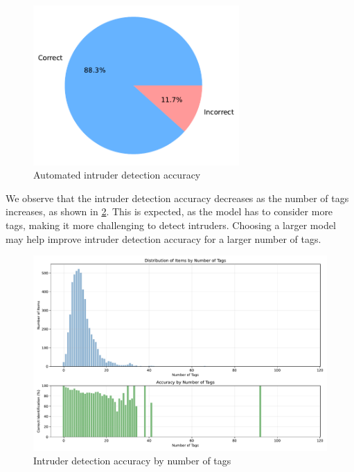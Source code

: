 \begin{figure}[h]
    \centering
    \includegraphics[width=0.7\textwidth]{figures/gpt_intruder_detection_accuracy.pdf}
    \caption{Automated intruder detection accuracy}
    \label{fig:gpt_intruder_detection_accuracy}
\end{figure}

We observe that the intruder detection accuracy decreases as the number of tags increases, as shown in \cref{fig:gpt_accuracy_by_num_tags}. This is expected, as the model has to consider more tags, making it more challenging to detect intruders. Choosing a larger model may help improve intruder detection accuracy for a larger number of tags.

\begin{figure}[h]
    \centering
    \includegraphics[width=\textwidth]{figures/gpt_accuracy_by_num_tags.pdf}
    \caption{Intruder detection accuracy by number of tags}
    \label{fig:gpt_accuracy_by_num_tags}
\end{figure}

